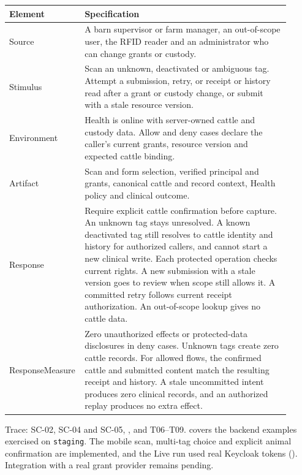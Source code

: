 {\small
\begin{longtable}{|p{0.19\linewidth}|p{0.72\linewidth}|}
\hline
\textbf{Element} & \textbf{Specification} \\ \hline
\endhead
Source & A barn supervisor or farm manager, an out-of-scope user,
the RFID reader and an administrator who can change grants or custody. \\ \hline
Stimulus & Scan an unknown, deactivated or ambiguous tag. Attempt a
submission, retry, or receipt or history read after a grant or custody
change, or submit with a stale resource version. \\ \hline
Environment & Health is online with server-owned cattle and custody data.
Allow and deny cases declare the caller's current grants, resource
version and expected cattle binding. \\ \hline
Artifact & Scan and form selection, verified principal and grants,
canonical cattle and record context, Health policy and clinical outcome. \\ \hline
Response & Require explicit cattle confirmation before capture. An unknown
tag stays unresolved. A known deactivated tag still resolves to cattle
identity and history for authorized callers, and cannot start a new
clinical write. Each protected operation checks current rights. A
new submission with a stale version goes to review when scope still
allows it. A committed retry follows current receipt authorization.
An out-of-scope lookup gives no cattle data. \\ \hline
Response\newline Measure & Zero unauthorized effects or protected-data
disclosures in deny cases. Unknown tags create zero cattle records.
For allowed flows, the confirmed cattle and submitted content match
the resulting receipt and history. A stale uncommitted intent produces
zero clinical records, and an authorized replay produces no extra
effect. \\ \hline
\end{longtable}
}

Trace: SC-02, SC-04 and SC-05, , and T06--T09.
 covers the backend examples exercised on
\texttt{staging}. The mobile scan, multi-tag choice and explicit
animal confirmation are implemented, and the Live run used real
Keycloak tokens (). Integration with
a real grant provider remains pending.
